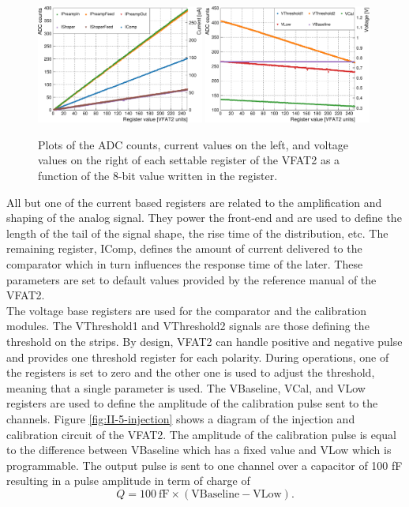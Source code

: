       \begin{figure}[h!]
        \centering
        \includegraphics[width=0.49\textwidth]{img/plots/cADC_Current-crop}
        \includegraphics[width=0.49\textwidth]{img/plots/cADC_Voltage-crop}
        \caption{Plots of the ADC counts, current values on the left, and voltage values on the right of each settable register of the VFAT2 as a function of the 8-bit value written in the register.}
        \label{fig:II-5-adc}
      \end{figure}

      All but one of the current based registers are related to the amplification and shaping of the analog signal. They power the front-end and are used to define the length of the tail of the signal shape, the rise time of the distribution, etc. The remaining register, IComp, defines the amount of current delivered to the comparator which in turn influences the response time of the later. These parameters are set to default values provided by the reference manual of the VFAT2. \\

      The voltage base registers are used for the comparator and the calibration modules. The VThreshold1 and VThreshold2 signals are those defining the threshold on the strips. By design, VFAT2 can handle positive and negative pulse and provides one threshold register for each polarity. During operations, one of the registers is set to zero and the other one is used to adjust the threshold, meaning that a single parameter is used. The VBaseline, VCal, and VLow registers are used to define the amplitude of the calibration pulse sent to the channels. Figure \ref{fig:II-5-injection} shows a diagram of the injection and calibration circuit of the VFAT2. The amplitude of the calibration pulse is equal to the difference between VBaseline which has a fixed value and VLow which is programmable. The output pulse is sent to one channel over a capacitor of 100 fF resulting in a pulse amplitude in term of charge of
      \begin{equation}
        Q = 100 \ \text{fF} \times \left(\text{VBaseline} - \text{VLow} \right) .
      \end{equation}

